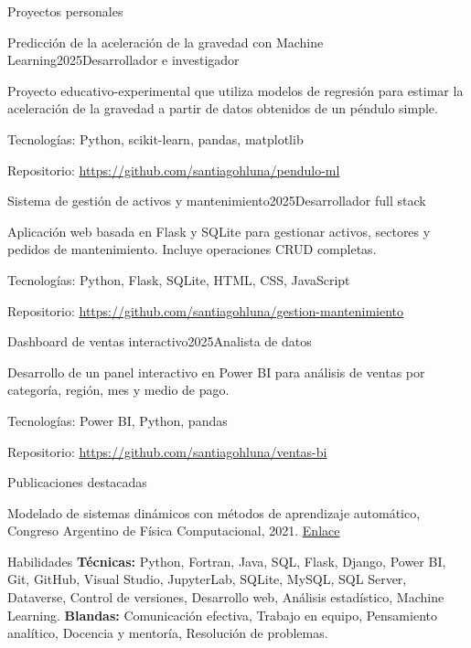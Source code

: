 \documentclass[a4paper,10pt]{resume}
\begin{document}
\begin{rSection}{Proyectos personales}
\begin{rSubsection}{Predicción de la aceleración de la gravedad con Machine Learning}{2025}{Desarrollador e investigador}{}
\item Proyecto educativo-experimental que utiliza modelos de regresión para estimar la aceleración de la gravedad a partir de datos obtenidos de un péndulo simple.
\item Tecnologías: Python, scikit-learn, pandas, matplotlib
\item Repositorio: \href{https://github.com/santiagohluna/pendulo-ml}{https://github.com/santiagohluna/pendulo-ml}
\end{rSubsection}
\begin{rSubsection}{Sistema de gestión de activos y mantenimiento}{2025}{Desarrollador full stack}{}
\item Aplicación web basada en Flask y SQLite para gestionar activos, sectores y pedidos de mantenimiento. Incluye operaciones CRUD completas.
\item Tecnologías: Python, Flask, SQLite, HTML, CSS, JavaScript
\item Repositorio: \href{https://github.com/santiagohluna/gestion-mantenimiento}{https://github.com/santiagohluna/gestion-mantenimiento}
\end{rSubsection}
\begin{rSubsection}{Dashboard de ventas interactivo}{2025}{Analista de datos}{}
\item Desarrollo de un panel interactivo en Power BI para análisis de ventas por categoría, región, mes y medio de pago.
\item Tecnologías: Power BI, Python, pandas
\item Repositorio: \href{https://github.com/santiagohluna/ventas-bi}{https://github.com/santiagohluna/ventas-bi}
\end{rSubsection}
\end{rSection}
\begin{rSection}{Publicaciones destacadas}
\item Modelado de sistemas dinámicos con métodos de aprendizaje automático, Congreso Argentino de Física Computacional, 2021. \href{https://example.com/publicacion1}{Enlace}
\end{rSection}
\begin{rSection}{Habilidades}
\textbf{Técnicas:} Python, Fortran, Java, SQL, Flask, Django, Power BI, Git, GitHub, Visual Studio, JupyterLab, SQLite, MySQL, SQL Server, Dataverse, Control de versiones, Desarrollo web, Análisis estadístico, Machine Learning.
\textbf{Blandas:} Comunicación efectiva, Trabajo en equipo, Pensamiento analítico, Docencia y mentoría, Resolución de problemas.
\end{rSection}
\end{document}
